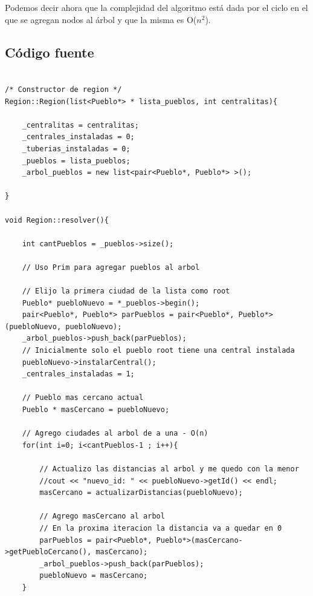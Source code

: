 Podemos decir ahora que la complejidad del algoritmo est\'a dada por el ciclo en el que se agregan nodos al \'arbol y que la misma es O($n^2$).

\newpage

\subsection{C\'odigo fuente}

\begin{lstlisting}

/* Constructor de region */
Region::Region(list<Pueblo*> * lista_pueblos, int centralitas){
	
	_centralitas = centralitas;
	_centrales_instaladas = 0;
	_tuberias_instaladas = 0;
	_pueblos = lista_pueblos;
	_arbol_pueblos = new list<pair<Pueblo*, Pueblo*> >();

}

void Region::resolver(){

	int cantPueblos = _pueblos->size();
	
	// Uso Prim para agregar pueblos al arbol

	// Elijo la primera ciudad de la lista como root
	Pueblo* puebloNuevo = *_pueblos->begin();
	pair<Pueblo*, Pueblo*> parPueblos = pair<Pueblo*, Pueblo*>(puebloNuevo, puebloNuevo);
	_arbol_pueblos->push_back(parPueblos);
	// Inicialmente solo el pueblo root tiene una central instalada
	puebloNuevo->instalarCentral();
	_centrales_instaladas = 1;

	// Pueblo mas cercano actual
	Pueblo * masCercano = puebloNuevo;

	// Agrego ciudades al arbol de a una - O(n)
	for(int i=0; i<cantPueblos-1 ; i++){
		
		// Actualizo las distancias al arbol y me quedo con la menor
		//cout << "nuevo_id: " << puebloNuevo->getId() << endl;
		masCercano = actualizarDistancias(puebloNuevo);

		// Agrego masCercano al arbol
		// En la proxima iteracion la distancia va a quedar en 0
		parPueblos = pair<Pueblo*, Pueblo*>(masCercano->getPuebloCercano(), masCercano);
		_arbol_pueblos->push_back(parPueblos);
		puebloNuevo = masCercano;
	}


\end{lstlisting}

